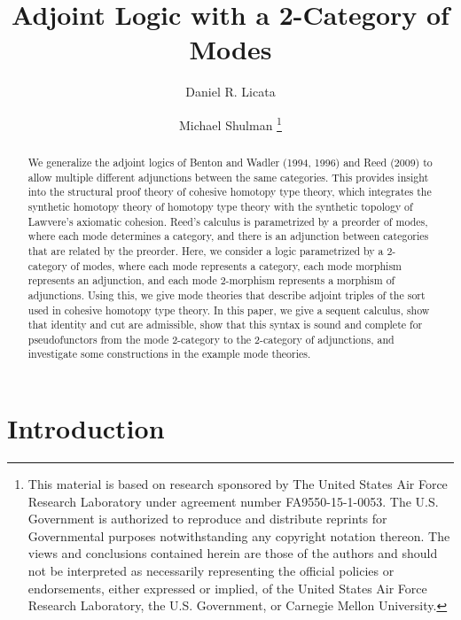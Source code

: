 \documentclass{drl-common/llncs}
\title{Adjoint Logic with a 2-Category of Modes}
\author{Daniel R. Licata\inst{1} \and Michael Shulman\inst{2}
\thanks{
This material is based on research sponsored by The United States Air
Force Research Laboratory under agreement number FA9550-15-1-0053. The
U.S. Government is authorized to reproduce and distribute reprints for
Governmental purposes notwithstanding any copyright notation thereon.
The views and conclusions contained herein are those of the authors and
should not be interpreted as necessarily representing the official
policies or endorsements, either expressed or implied, of the United
States Air Force Research Laboratory, the U.S. Government, or Carnegie
Mellon University.
}}
\institute{Wesleyan University \and University of San Diego}
\begin{document}
\maketitle

\begin{abstract}
We generalize the adjoint logics of Benton and Wadler (1994, 1996) and
Reed (2009) to allow multiple different adjunctions between the same
categories.  This provides insight into the structural proof theory of
cohesive homotopy type theory, which integrates the synthetic homotopy
theory of homotopy type theory with the synthetic topology of Lawvere's
axiomatic cohesion.  Reed's calculus is parametrized by a preorder of
modes, where each mode determines a category, and there is an adjunction
between categories that are related by the preorder.  Here, we consider
a logic parametrized by a 2-category of modes, where each mode
represents a category, each mode morphism represents an adjunction, and
each mode 2-morphism represents a morphism of adjunctions.  Using this,
we give mode theories that describe adjoint triples of the sort used in
cohesive homotopy type theory.  In this paper, we give a sequent
calculus, show that identity and cut are admissible, show that this
syntax is sound and complete for pseudofunctors from the mode 2-category
to the 2-category of adjunctions, and investigate some constructions in
the example mode theories.
\end{abstract}

\section{Introduction}
\end{document}
